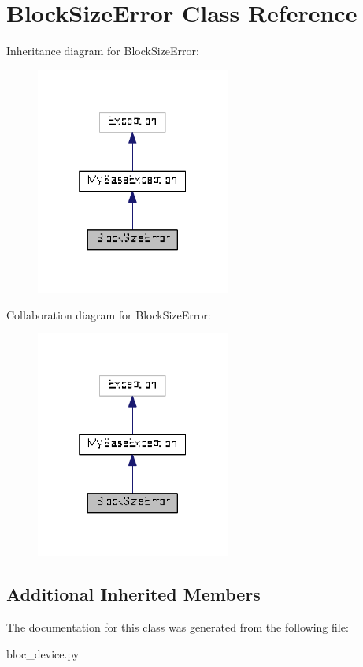 \hypertarget{classbloc__device_1_1_block_size_error}{}\section{Block\+Size\+Error Class Reference}
\label{classbloc__device_1_1_block_size_error}


Inheritance diagram for Block\+Size\+Error\+:
\nopagebreak
\begin{figure}[H]
\begin{center}
\leavevmode
\includegraphics[width=181pt]{classbloc__device_1_1_block_size_error__inherit__graph}
\end{center}
\end{figure}


Collaboration diagram for Block\+Size\+Error\+:
\nopagebreak
\begin{figure}[H]
\begin{center}
\leavevmode
\includegraphics[width=181pt]{classbloc__device_1_1_block_size_error__coll__graph}
\end{center}
\end{figure}
\subsection*{Additional Inherited Members}


The documentation for this class was generated from the following file\+:\begin{DoxyCompactItemize}
\item 
bloc\+\_\+device.\+py\end{DoxyCompactItemize}
